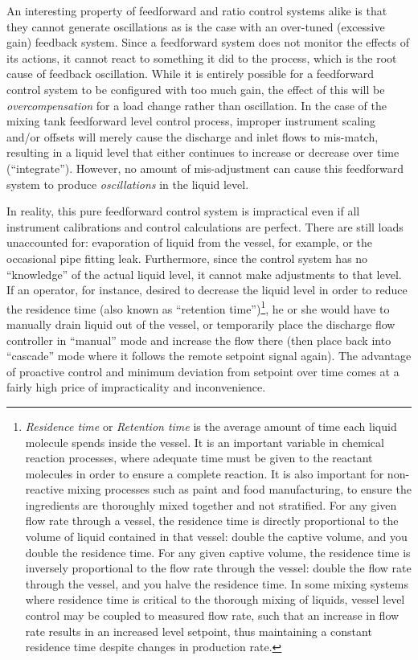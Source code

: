 \vskip 10pt

An interesting property of feedforward and ratio control systems alike is that they cannot generate oscillations as is the case with an over-tuned (excessive gain) feedback system.  Since a feedforward system does not monitor the effects of its actions, it cannot react to something it did to the process, which is the root cause of feedback oscillation.  While it is entirely possible for a feedforward control system to be configured with too much gain, the effect of this will be \textit{overcompensation} for a load change rather than oscillation.  In the case of the mixing tank feedforward level control process, improper instrument scaling and/or offsets will merely cause the discharge and inlet flows to mis-match, resulting in a liquid level that either continues to increase or decrease over time (``integrate'').  However, no amount of mis-adjustment can cause this feedforward system to produce \textit{oscillations} in the liquid level.

In reality, this pure feedforward control system is impractical even if all instrument calibrations and control calculations are perfect.  There are still loads unaccounted for: evaporation of liquid from the vessel, for example, or the occasional pipe fitting leak.  Furthermore, since the control system has no ``knowledge'' of the actual liquid level, it cannot make adjustments to that level.  If an operator, for instance, desired to decrease the liquid level in order to reduce the residence time (also known as ``retention time'')\footnote{\textit{Residence time} or \textit{Retention time} is the average amount of time each liquid molecule spends inside the vessel.  It is an important variable in chemical reaction processes, where adequate time must be given to the reactant molecules in order to ensure a complete reaction.  It is also important for non-reactive mixing processes such as paint and food manufacturing, to ensure the ingredients are thoroughly mixed together and not stratified.  For any given flow rate through a vessel, the residence time is directly proportional to the volume of liquid contained in that vessel: double the captive volume, and you double the residence time.  For any given captive volume, the residence time is inversely proportional to the flow rate through the vessel: double the flow rate through the vessel, and you halve the residence time.  In some mixing systems where residence time is critical to the thorough mixing of liquids, vessel level control may be coupled to measured flow rate, such that an increase in flow rate results in an increased level setpoint, thus maintaining a constant residence time despite changes in production rate.}, he or she would have to manually drain liquid out of the vessel, or temporarily place the discharge flow controller in ``manual'' mode and increase the flow there (then place back into ``cascade'' mode where it follows the remote setpoint signal again).  The advantage of proactive control and minimum deviation from setpoint over time comes at a fairly high price of impracticality and inconvenience.    

